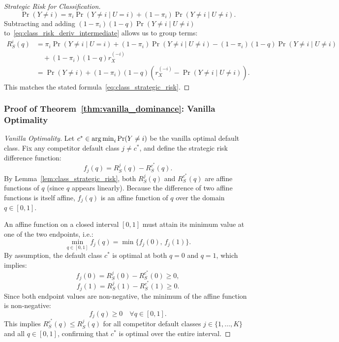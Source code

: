 \begin{proof}[Strategic Risk for Classification]
\begin{equation}
    \Pr(Y \ne i) = \pi_i \Pr(Y \ne i \mid U = i) + (1 - \pi_i)\Pr(Y \ne i \mid U \ne i).
\end{equation}
Subtracting and adding $(1 - \pi_i)(1 - q)\Pr(Y \ne i \mid U \ne i)$ to~\eqref{eq:class_risk_deriv_intermediate} allows us to group terms:
\begin{align}
    R^i_S(q) &= \pi_i \Pr(Y \ne i \mid U = i) + (1 - \pi_i)\Pr(Y \ne i \mid U \ne i) - (1 - \pi_i)(1 - q)\Pr(Y \ne i \mid U \ne i) \nonumber \\
    &\quad + (1 - \pi_i)(1 - q)r^{(-i)}_X \nonumber \\
    &= \Pr(Y \ne i) + (1 - \pi_i)(1 - q)\left( r^{(-i)}_X - \Pr(Y \ne i \mid U \ne i) \right).
\end{align}
This matches the stated formula~\eqref{eq:class_strategic_risk}.
\end{proof}

\subsubsection*{Proof of Theorem~\ref{thm:vanilla_dominance}: Vanilla Optimality}
\label{app:proof_vanilla_dominance}
\begin{proof}[Vanilla Optimality]
Let $c^* \in \operatorname*{arg\,min}_i \Pr(Y \ne i)$ be the vanilla optimal default class. Fix any competitor default class $j \ne c^*$, and define the strategic risk difference function:
\begin{equation}
    f_j(q) = R^j_S(q) - R^{c^*}_S(q).
\end{equation}
By Lemma~\ref{lem:class_strategic_risk}, both $R^j_S(q)$ and $R^{c^*}_S(q)$ are affine functions of $q$ (since $q$ appears linearly). Because the difference of two affine functions is itself affine, $f_j(q)$ is an affine function of $q$ over the domain $q \in [0, 1]$.

An affine function on a closed interval $[0, 1]$ must attain its minimum value at one of the two endpoints, i.e.:
\begin{equation}
    \min_{q \in [0, 1]} f_j(q) = \min\{ f_j(0), \, f_j(1) \}.
\end{equation}
By assumption, the default class $c^*$ is optimal at both $q = 0$ and $q = 1$, which implies:
\begin{equation}
    f_j(0) = R^j_S(0) - R^{c^*}_S(0) \ge 0,
\end{equation}
\begin{equation}
    f_j(1) = R^j_S(1) - R^{c^*}_S(1) \ge 0.
\end{equation}
Since both endpoint values are non-negative, the minimum of the affine function is non-negative:
\begin{equation}
    f_j(q) \ge 0 \quad \forall q \in [0, 1].
\end{equation}
This implies $R^{c^*}_S(q) \le R^j_S(q)$ for all competitor default classes $j \in \{1, \dots, K\}$ and all $q \in [0, 1]$, confirming that $c^*$ is optimal over the entire interval.
\end{proof}

